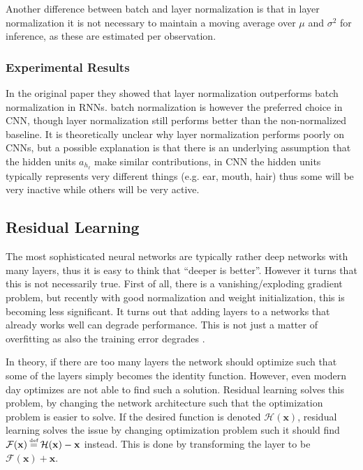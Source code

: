 Another difference between batch and layer normalization is that in layer normalization it is not necessary to maintain a moving average over $\mu$ and $\sigma^2$ for inference, as these are estimated per observation.

\subsubsection{Experimental Results}

In the original paper \cite{layer-normalization} they showed that layer normalization outperforms batch normalization in RNNs. batch normalization is however the preferred choice in CNN, though layer normalization still performs better than the non-normalized baseline. It is theoretically unclear why layer normalization performs poorly on CNNs, but a possible explanation is that there is an underlying assumption that the hidden units $a_{h_\ell}$ make similar contributions, in CNN the hidden units typically represents very different things (e.g. ear, mouth, hair) thus some will be very inactive while others will be very active.

\subsection{Residual Learning}

The most sophisticated neural networks are typically rather deep networks with many layers, thus it is easy to think that ``deeper is better''. However it turns that this is not necessarily true. First of all, there is a vanishing/exploding gradient problem, but recently with good normalization and weight initialization, this is becoming less significant. It turns out that adding layers to a networks that already works well can degrade performance. This is not just a matter of overfitting as also the training error degrades \cite{residual-learning}.

In theory, if there are too many layers the network should optimize such that some of the layers simply becomes the identity function. However, even modern day optimizes are not able to find such a solution. Residual learning solves this problem, by changing the network architecture such that the optimization problem is easier to solve. If the desired function is denoted $\mathcal{H}(\mathbf{x})$, residual learning solves the issue by changing optimization problem such it should find $\mathcal{F}(\mathbf{x}) \defeq \mathcal{H}(\mathbf{x}) - \mathbf{x}$ instead. This is done by transforming the layer to be $\mathcal{F}(\mathbf{x}) + \mathbf{x}$.

